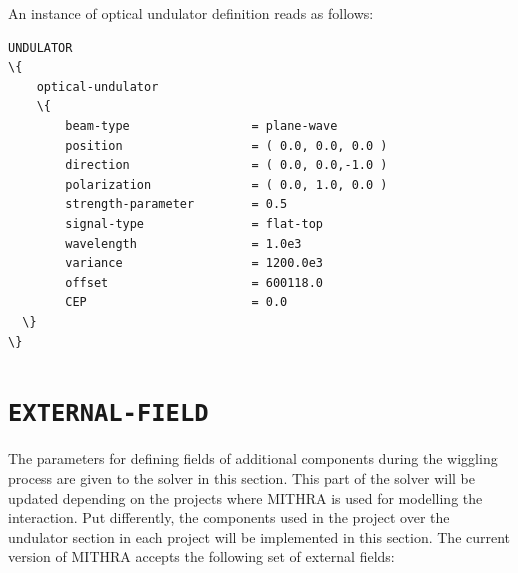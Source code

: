 %
An instance of optical undulator definition reads as follows:
%
\begin{snugshade}
\begin{Verbatim}[fontsize=\small, tabsize=4, fontfamily=courier, fontseries=b, commandchars=\\\{\}, obeytabs]
UNDULATOR
\{
	optical-undulator
	\{
		beam-type				  = plane-wave
		position				  = ( 0.0, 0.0, 0.0 )
		direction				  = ( 0.0, 0.0,-1.0 )
		polarization			  = ( 0.0, 1.0, 0.0 )
		strength-parameter		  = 0.5
		signal-type				  = flat-top
		wavelength				  = 1.0e3
		variance				  = 1200.0e3
		offset					  = 600118.0
		CEP						  = 0.0
  \}
\}
\end{Verbatim}
\end{snugshade}

\section{\texttt{EXTERNAL-FIELD}}

The parameters for defining fields of additional components during the wiggling process are given to the solver in this section.
%
This part of the solver will be updated depending on the projects where MITHRA is used for modelling the interaction.
%
Put differently, the components used in the project over the undulator section in each project will be implemented in this section.
%
The current version of MITHRA accepts the following set of external fields:


